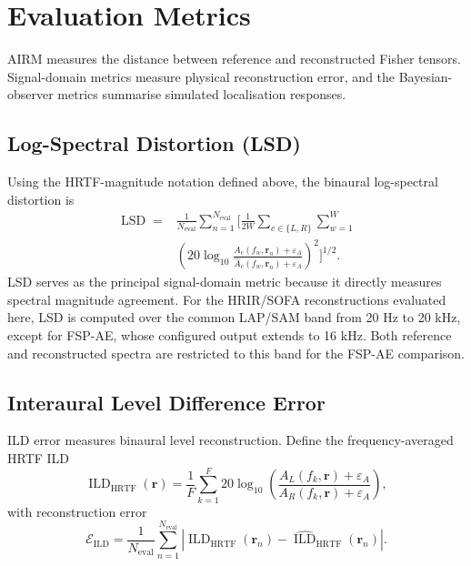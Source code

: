 \documentclass[journal]{IEEEtran}
\begin{document}
\section{Evaluation Metrics}
AIRM measures the distance between reference and reconstructed Fisher tensors. Signal-domain metrics measure physical reconstruction error, and the Bayesian-observer metrics summarise simulated localisation responses.

\subsection{Log-Spectral Distortion (LSD)}
Using the HRTF-magnitude notation defined above, the binaural log-spectral distortion is
\begin{equation}
\begin{aligned}
\operatorname{LSD}
={}&\frac{1}{N_{\mathrm{eval}}}
\sum_{n=1}^{N_{\mathrm{eval}}}\Biggl[
\frac{1}{2W}\sum_{c\in\{L,R\}}\sum_{w=1}^{W}\\
&\left(
20\log_{10}
\frac{A_c(f_w,\mathbf{r}_n)+\varepsilon_A}
{\widehat{A}_c(f_w,\mathbf{r}_n)+\varepsilon_A}
\right)^2\Biggr]^{1/2}.
\end{aligned}
\end{equation}
LSD serves as the principal signal-domain metric because it directly measures spectral magnitude agreement. For the HRIR/SOFA reconstructions evaluated here, LSD is computed over the common LAP/SAM band from 20 Hz to 20 kHz, except for FSP-AE, whose configured output extends to 16 kHz. Both reference and reconstructed spectra are restricted to this band for the FSP-AE comparison.

\subsection{Interaural Level Difference Error}
ILD error measures binaural level reconstruction. Define the frequency-averaged HRTF ILD
\begin{equation}
\operatorname{ILD}_{\mathrm{HRTF}}(\mathbf{r})
=
\frac{1}{F}\sum_{k=1}^{F}
20\log_{10}\!\left(
\frac{A_L(f_k,\mathbf{r})+\varepsilon_A}
     {A_R(f_k,\mathbf{r})+\varepsilon_A}
\right),
\end{equation}
with reconstruction error
\begin{equation}
\mathcal{E}_{\mathrm{ILD}}
=
\frac{1}{N_{\mathrm{eval}}}\sum_{n=1}^{N_{\mathrm{eval}}}
\left|
\operatorname{ILD}_{\mathrm{HRTF}}(\mathbf{r}_n)
-\widehat{\operatorname{ILD}}_{\mathrm{HRTF}}(\mathbf{r}_n)
\right|.
\end{equation}
\end{document}
